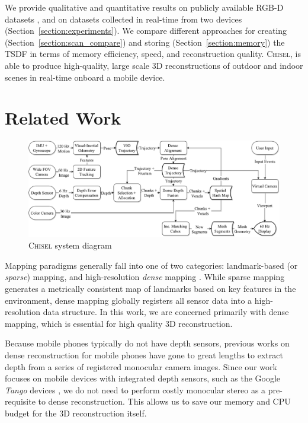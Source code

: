 \documentclass[conference]{IEEEtran}
\newcommand{\sref}[1]{Section~\ref{#1}}
\newcommand{\Tango}{\textit{Tango}\xspace}
\newcommand{\TSDF}{TSDF\xspace}
\newcommand{\chisel}{\textsc{Chisel}\xspace}
\begin{document}
 We provide qualitative and  quantitative results on publicly available RGB-D
 datasets \cite{FREIBURG}, and on datasets collected in real-time from two
 devices (\sref{section:experiments}). We compare different approaches for
 creating (\sref{section:scan_compare}) and storing (\sref{section:memory}) the
 \TSDF in terms of memory efficiency, speed, and reconstruction quality.
 \chisel, is able to produce high-quality, large scale 3D reconstructions of
 outdoor and indoor scenes in real-time onboard a mobile device.

\section{Related Work}
\label{sec:related_work}
\begin{figure}\centering
	      \includegraphics[width=1.0\textwidth]{img/system_diagram}
	      \caption{\chisel system diagram}
	 	 \label{fig:system_diagram}
\end{figure}
Mapping paradigms generally fall into one of two categories: landmark-based (or
\emph{sparse}) mapping, and high-resolution \emph{dense} mapping
\cite{FastSlam}.  While sparse mapping generates a metrically consistent map of
landmarks based on key features in the environment, dense mapping globally
registers all sensor data into a high-resolution data structure. In this work,
we are concerned primarily with dense mapping, which is essential for high
quality 3D reconstruction.

Because mobile phones typically do not have depth sensors, previous works
\cite{TanskanenMetric, DTAM, LSDSlam} on dense reconstruction for mobile phones
have gone to great lengths to extract depth from a series of registered monocular camera
images. Since our work focuses on mobile devices with integrated depth sensors,
such as the Google \Tango devices \cite{Tango}, we do not need to perform
costly monocular stereo as a pre-requisite to dense reconstruction. This allows
us to save our memory and CPU budget for the 3D reconstruction itself.
\end{document}
